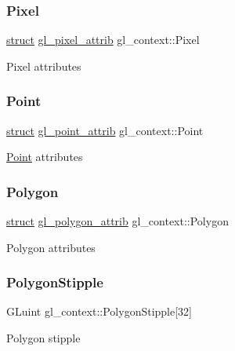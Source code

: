 \subsubsection{\texorpdfstring{Pixel}{Pixel}}
{\footnotesize\ttfamily \hyperlink{interfacestruct}{struct} \hyperlink{structgl__pixel__attrib}{gl\+\_\+pixel\+\_\+attrib} gl\+\_\+context\+::\+Pixel}

Pixel attributes \mbox{\label{structgl__context_a79d8f2f5bb031562f2136478c55fc249}} 
\subsubsection{\texorpdfstring{Point}{Point}}
{\footnotesize\ttfamily \hyperlink{interfacestruct}{struct} \hyperlink{structgl__point__attrib}{gl\+\_\+point\+\_\+attrib} gl\+\_\+context\+::\+Point}

\hyperlink{struct_point}{Point} attributes \mbox{\label{structgl__context_a49528675fd9c10af309a499891392aa4}} 
\subsubsection{\texorpdfstring{Polygon}{Polygon}}
{\footnotesize\ttfamily \hyperlink{interfacestruct}{struct} \hyperlink{structgl__polygon__attrib}{gl\+\_\+polygon\+\_\+attrib} gl\+\_\+context\+::\+Polygon}

Polygon attributes \mbox{\label{structgl__context_af3af2af1154e6b8670f8d5076e299095}} 
\subsubsection{\texorpdfstring{Polygon\+Stipple}{PolygonStipple}}
{\footnotesize\ttfamily G\+Luint gl\+\_\+context\+::\+Polygon\+Stipple\mbox{[}32\mbox{]}}

Polygon stipple \mbox{\label{structgl__context_afda14363ac59455b69f5f00c4f967054}} 
